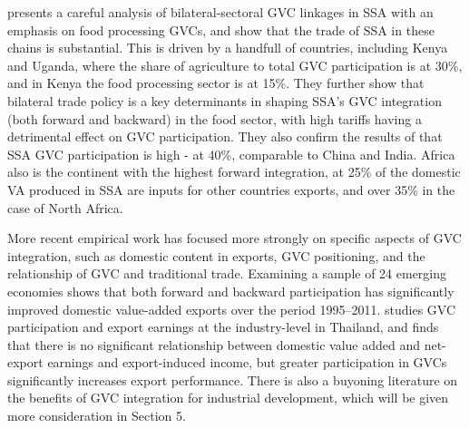 \documentclass[a4paper]{article}
\begin{document}
\citet{balie2019does} presents a careful analysis of bilateral-sectoral GVC linkages in SSA with an emphasis on food processing GVCs, and show that the trade of SSA in these chains is substantial. This is driven by a handfull of countries, including Kenya and Uganda, where the share of agriculture to total GVC participation is at 30\%, and in Kenya the food processing sector is at 15\%. They further show that bilateral trade policy is a key determinants in shaping SSA's GVC integration (both forward and backward) in the food sector, with high tariffs having a detrimental effect on GVC participation. They also confirm the results of \citep{foster2015global} that SSA GVC participation is high - at 40\%, comparable to China and India. Africa also is the continent with the highest forward integration, at 25\% of the domestic VA produced in SSA are inputs for other countries exports, and over 35\% in the case of North Africa.

More recent empirical work has focused more strongly on specific aspects of GVC integration, such as domestic content in exports, GVC positioning, and the relationship of GVC and traditional trade. Examining a sample of 24 emerging economies \citet{jangam2021does} shows that both forward and backward participation has significantly improved domestic value-added exports over the period 1995–2011. \citet{durongkaveroj2023emphasis} studies GVC participation and export earnings at the industry-level in Thailand, and finds that there is no significant relationship between domestic value added and net-export earnings and export-induced income, but greater participation in GVCs significantly increases export performance. There is also a buyoning literature on the benefits of GVC integration for industrial development, which will be given more consideration in Section 5.  \newline

\end{document}
